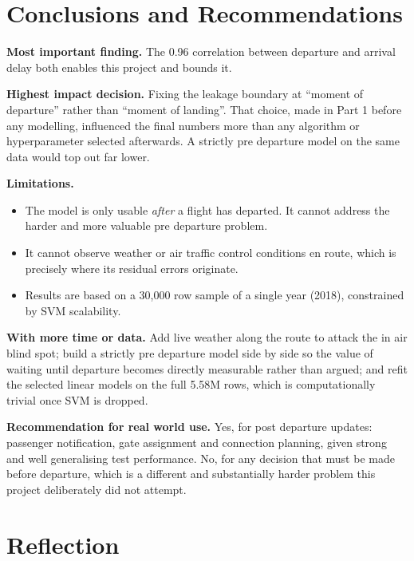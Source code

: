 \documentclass[11pt,a4paper]{article}
\begin{document}
\section{Conclusions and Recommendations}

\textbf{Most important finding.} The 0.96 correlation between departure and arrival
delay both enables this project and bounds it.

\textbf{Highest impact decision.} Fixing the leakage boundary at ``moment of departure''
rather than ``moment of landing''. That choice, made in Part 1 before any modelling,
influenced the final numbers more than any algorithm or hyperparameter selected
afterwards. A strictly pre departure model on the same data would top out far lower.

\textbf{Limitations.}
\begin{itemize}
  \item The model is only usable \emph{after} a flight has departed. It cannot address
        the harder and more valuable pre departure problem.
  \item It cannot observe weather or air traffic control conditions en route, which is
        precisely where its residual errors originate.
  \item Results are based on a 30,000 row sample of a single year (2018), constrained by
        SVM scalability.
\end{itemize}

\textbf{With more time or data.} Add live weather along the route to attack the in air
blind spot; build a strictly pre departure model side by side so the value of waiting
until departure becomes directly measurable rather than argued; and refit the selected
linear models on the full 5.58M rows, which is computationally trivial once SVM is
dropped.

\textbf{Recommendation for real world use.} Yes, for post departure updates: passenger
notification, gate assignment and connection planning, given strong and well generalising
test performance. No, for any decision that must be made before departure, which is a
different and substantially harder problem this project deliberately did not attempt.

\section{Reflection}
\end{document}
